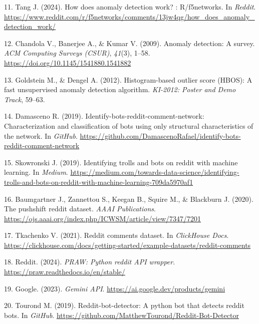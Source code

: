 \documentclass[
  12pt,
  letterpaper,
  DIV=11,
  numbers=noendperiod,
  abstract]{scrartcl}
\newlength{\cslhangindent}
\newenvironment{CSLReferences}[2] %
 {\begin{list}{}{%
  \setlength{\itemindent}{0pt}
  \setlength{\leftmargin}{0pt}
  \setlength{\parsep}{0pt}
  \ifodd #1
   \setlength{\leftmargin}{\cslhangindent}
   \setlength{\itemindent}{-1\cslhangindent}
  \fi
  \setlength{\itemsep}{#2\baselineskip}}}
 {\end{list}}
\begin{document}
\begin{CSLReferences}{1}{0}
11. Tang J. (2024). How does anomaly detection work? : R/f5networks. In
\emph{Reddit}.
\url{https://www.reddit.com/r/f5networks/comments/13jw4qg/how_does_anomaly_detection_work/}

12. Chandola V., Banerjee A., \& Kumar V. (2009). Anomaly detection: A
survey. \emph{ACM Computing Surveys (CSUR)}, \emph{41}(3), 1--58.
\url{https://doi.org/10.1145/1541880.1541882}

13. Goldstein M., \& Dengel A. (2012). Histogram-based outlier score
(HBOS): A fast unsupervised anomaly detection algorithm. \emph{KI-2012:
Poster and Demo Track}, 59--63.

14. Damasceno R. (2019). Identify-bots-reddit-comment-network:
Characterization and classification of bots using only structural
characteristics of the network. In \emph{GitHub}.
\url{https://github.com/DamascenoRafael/identify-bots-reddit-comment-network}

15. Skowronski J. (2019). Identifying trolls and bots on reddit with
machine learning. In \emph{Medium}.
\url{https://medium.com/towards-data-science/identifying-trolls-and-bots-on-reddit-with-machine-learning-709da5970af1}

16. Baumgartner J., Zannettou S., Keegan B., Squire M., \& Blackburn J.
(2020). The pushshift reddit dataset. \emph{AAAI Publications}.
\url{https://ojs.aaai.org/index.php/ICWSM/article/view/7347/7201}

17. Tkachenko V. (2021). Reddit comments dataset. In \emph{ClickHouse
Docs}.
\url{https://clickhouse.com/docs/getting-started/example-datasets/reddit-comments}

18. Reddit. (2024). \emph{{PRAW}: Python reddit API wrapper}.
\url{https://praw.readthedocs.io/en/stable/}

19. Google. (2023). \emph{Gemini API}.
\url{https://ai.google.dev/products/gemini}

20. Tourond M. (2019). Reddit-bot-detector: A python bot that detects
reddit bots. In \emph{GitHub}.
\url{https://github.com/MatthewTourond/Reddit-Bot-Detector}


\end{CSLReferences}
\end{document}
